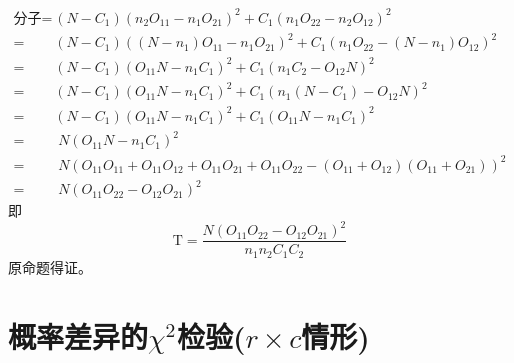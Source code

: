 \documentclass[a4paper, 11pt]{article}
\begin{document}
\begin{equation}\nonumber
\begin{aligned}
\text{分子}
=&\left(N-C_{1}\right)\left(n_{2} O_{11}-n_{1} O_{21}\right)^{2}+C_{1}\left(n_{1} O_{22}-n_{2} O_{12}\right)^{2} \\
=&\left(N-C_{1}\right)\left(\left(N-n_{1}\right) O_{11}-n_{1} O_{21}\right)^{2}+C_{1}\left(n_{1} O_{22}-\left(N-n_{1}\right) O_{12}\right)^{2} \\
=&\left(N-C_{1}\right)\left(O_{11} N-n_{1} C_{1}\right)^{2}+C_{1}\left(n_{1} C_{2}-O_{12} N\right)^{2} \\
=&\left(N-C_{1}\right)\left(O_{11} N-n_{1} C_{1}\right)^{2}+C_{1}\left(n_{1}\left(N-C_{1}\right)-O_{12} N\right)^{2} \\
=&\left(N-C_{1}\right)\left(O_{11} N-n_{1} C_{1}\right)^{2}+C_{1}\left(O_{11} N-n_{1} C_{1}\right)^{2} \\
=& \;N\left(O_{11} N-n_{1} C_{1}\right)^{2}\\
=& \;N\left(O_{11} O_{11}+O_{11} O_{12}+O_{11} O_{21}+O_{11} O_{22}-\left(O_{11}+O_{12}\right)\left(O_{11}+O_{21}\right)\right)^{2} \\
=& \;N\left(O_{11} O_{22}-O_{12} O_{21}\right)^{2}
\end{aligned}
\end{equation}
即
$$\mathrm{T}=\frac{N\left(O_{11} O_{22}-O_{12} O_{21}\right)^{2}}{n_{1} n_{2} C_{1} C_{2}}$$
原命题得证。
\section{概率差异的$\chi^{2}$检验($r\times c$情形) }
\end{document}
